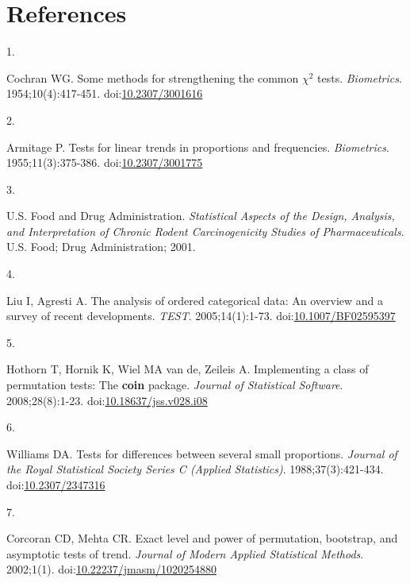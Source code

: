 \documentclass[
  11pt,
]{article}
\newlength{\cslhangindent}
\newlength{\csllabelwidth}
\newenvironment{CSLReferences}[2] %
 {\begin{list}{}{%
  \setlength{\itemindent}{0pt}
  \setlength{\leftmargin}{0pt}
  \setlength{\parsep}{0pt}
  \ifodd #1
   \setlength{\leftmargin}{\cslhangindent}
   \setlength{\itemindent}{-1\cslhangindent}
  \fi
  \setlength{\itemsep}{#2\baselineskip}}}
 {\end{list}}
\newcommand{\CSLLeftMargin}[1]{\parbox[t]{\csllabelwidth}{\strut#1\strut}}
\newcommand{\CSLRightInline}[1]{\parbox[t]{\linewidth - \csllabelwidth}{\strut#1\strut}}
\begin{document}
\section*{References}\label{references}

\protect{}\label{refs}
\begin{CSLReferences}{0}{1}
\CSLLeftMargin{1. }%
\CSLRightInline{Cochran WG. Some methods for strengthening the common \(\chi^2\) tests. \emph{Biometrics}. 1954;10(4):417-451. doi:\href{https://doi.org/10.2307/3001616}{10.2307/3001616}}

\CSLLeftMargin{2. }%
\CSLRightInline{Armitage P. Tests for linear trends in proportions and frequencies. \emph{Biometrics}. 1955;11(3):375-386. doi:\href{https://doi.org/10.2307/3001775}{10.2307/3001775}}

\CSLLeftMargin{3. }%
\CSLRightInline{U.S. Food and Drug Administration. \emph{Statistical Aspects of the Design, Analysis, and Interpretation of Chronic Rodent Carcinogenicity Studies of Pharmaceuticals}. U.S. Food; Drug Administration; 2001.}

\CSLLeftMargin{4. }%
\CSLRightInline{Liu I, Agresti A. The analysis of ordered categorical data: An overview and a survey of recent developments. \emph{TEST}. 2005;14(1):1-73. doi:\href{https://doi.org/10.1007/BF02595397}{10.1007/BF02595397}}

\CSLLeftMargin{5. }%
\CSLRightInline{Hothorn T, Hornik K, Wiel MA van de, Zeileis A. Implementing a class of permutation tests: The \textbf{coin} package. \emph{Journal of Statistical Software}. 2008;28(8):1-23. doi:\href{https://doi.org/10.18637/jss.v028.i08}{10.18637/jss.v028.i08}}

\CSLLeftMargin{6. }%
\CSLRightInline{Williams DA. Tests for differences between several small proportions. \emph{Journal of the Royal Statistical Society Series C (Applied Statistics)}. 1988;37(3):421-434. doi:\href{https://doi.org/10.2307/2347316}{10.2307/2347316}}

\CSLLeftMargin{7. }%
\CSLRightInline{Corcoran CD, Mehta CR. Exact level and power of permutation, bootstrap, and asymptotic tests of trend. \emph{Journal of Modern Applied Statistical Methods}. 2002;1(1). doi:\href{https://doi.org/10.22237/jmasm/1020254880}{10.22237/jmasm/1020254880}}


\end{CSLReferences}
\end{document}
